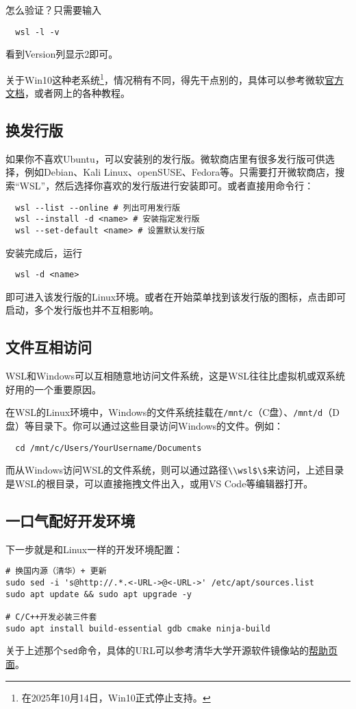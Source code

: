怎么验证？只需要输入
\begin{lstlisting}
  wsl -l -v
\end{lstlisting}
看到Version列显示2即可。

关于Win10这种老系统\footnote{在2025年10月14日，Win10正式停止支持。}，情况稍有不同，得先干点别的，具体可以参考微软\href{https://learn.microsoft.com/en-us/windows/wsl/install-manual}{官方文档}，或者网上的各种教程。

\subsection{换发行版}

如果你不喜欢Ubuntu，可以安装别的发行版。微软商店里有很多发行版可供选择，例如Debian、Kali Linux、openSUSE、Fedora等。只需要打开微软商店，搜索“WSL”，然后选择你喜欢的发行版进行安装即可。或者直接用命令行：
\begin{lstlisting}
  wsl --list --online # 列出可用发行版
  wsl --install -d <name> # 安装指定发行版
  wsl --set-default <name> # 设置默认发行版
\end{lstlisting}
安装完成后，运行
\begin{lstlisting}
  wsl -d <name>
\end{lstlisting}
即可进入该发行版的Linux环境。或者在开始菜单找到该发行版的图标，点击即可启动，多个发行版也并不互相影响。

\subsection{文件互相访问}

WSL和Windows可以互相随意地访问文件系统，这是WSL往往比虚拟机或双系统好用的一个重要原因。

在WSL的Linux环境中，Windows的文件系统挂载在\texttt{/mnt/c}（C盘）、\texttt{/mnt/d}（D盘）等目录下。你可以通过这些目录访问Windows的文件。例如：
\begin{lstlisting}
  cd /mnt/c/Users/YourUsername/Documents
\end{lstlisting}

而从Windows访问WSL的文件系统，则可以通过路径\texttt{\textbackslash \textbackslash wsl\$\textbackslash\$<distro-name>}来访问，上述目录是WSL的根目录，可以直接拖拽文件出入，或用VS Code等编辑器打开。

\subsection{一口气配好开发环境}

下一步就是和Linux一样的开发环境配置：
\begin{lstlisting}
# 换国内源（清华）+ 更新
sudo sed -i 's@http://.*.<-URL->@<-URL->' /etc/apt/sources.list
sudo apt update && sudo apt upgrade -y

# C/C++开发必装三件套
sudo apt install build-essential gdb cmake ninja-build
\end{lstlisting}
关于上述那个\texttt{sed}命令，具体的URL可以参考清华大学开源软件镜像站的\href{https://mirrors.tuna.tsinghua.edu.cn/help/ubuntu/}{帮助页面}。

